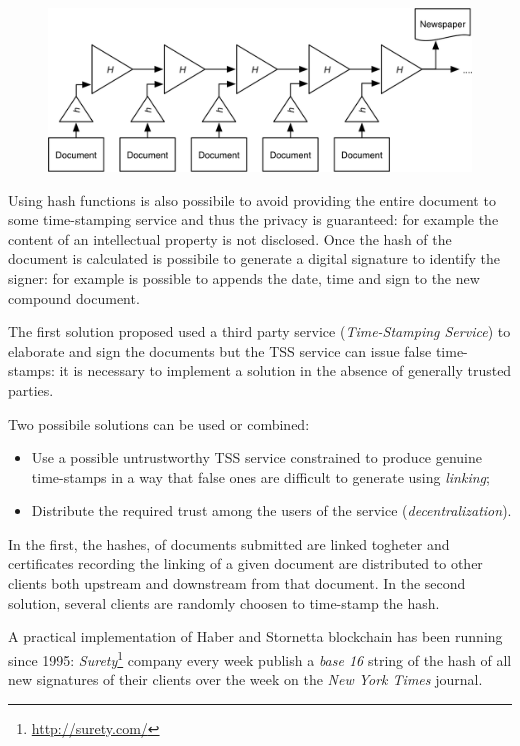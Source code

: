 \begin{figure}
    \centering
    \includegraphics[scale=1.2]{images/haberstornetta.png}
\end{figure}

Using hash functions is also possibile to avoid providing the entire document to some time-stamping service and thus the privacy is guaranteed: for example the content of an intellectual property is not disclosed.\newline\newline
Once the hash of the document is calculated is possibile to generate a digital signature to identify the signer: for example is possible to appends the date, time and sign to the new compound document.

The first solution proposed used a third party service (\textit{Time-Stamping Service}) to elaborate and sign the documents but the TSS service can issue false time-stamps: it is necessary to implement a solution in the absence of generally trusted parties.

Two possibile solutions can be used or combined:

\begin{itemize}
    \item Use a possible untrustworthy TSS service constrained to produce genuine time-stamps in a way that false ones are difficult to generate using \textit{linking};
    \item Distribute the required trust among the users of the service (\textit{decentralization}).
\end{itemize}

In the first, the hashes, of documents submitted are linked togheter and certificates recording the linking of a given document are distributed to other clients both upstream and downstream from that document.\newline
In the second solution, several clients are randomly choosen to time-stamp the hash.

A practical implementation of Haber and Stornetta blockchain has been running since 1995: \textit{Surety}\footnote{\url{http://surety.com/}} company every week publish a \textit{base 16} string of the hash of all new signatures of their clients over the week on the \textit{New York Times} journal.\\

